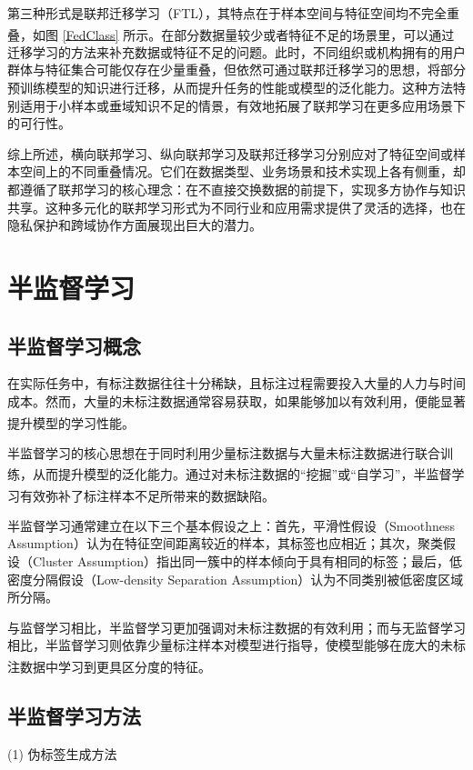 第三种形式是联邦迁移学习（FTL），其特点在于样本空间与特征空间均不完全重叠\textsuperscript{\cite{yang2019federated,chen2020vafl}}，如图 \ref{FedClass} 所示。在部分数据量较少或者特征不足的场景里，可以通过迁移学习的方法来补充数据或特征不足的问题。此时，不同组织或机构拥有的用户群体与特征集合可能仅存在少量重叠，但依然可通过联邦迁移学习的思想，将部分预训练模型的知识进行迁移，从而提升任务的性能或模型的泛化能力。这种方法特别适用于小样本或垂域知识不足的情景，有效地拓展了联邦学习在更多应用场景下的可行性。

综上所述，横向联邦学习、纵向联邦学习及联邦迁移学习分别应对了特征空间或样本空间上的不同重叠情况。它们在数据类型、业务场景和技术实现上各有侧重，却都遵循了联邦学习的核心理念：在不直接交换数据的前提下，实现多方协作与知识共享。这种多元化的联邦学习形式为不同行业和应用需求提供了灵活的选择，也在隐私保护和跨域协作方面展现出巨大的潜力。
\section{半监督学习}
\subsection{半监督学习概念}
在实际任务中，有标注数据往往十分稀缺，且标注过程需要投入大量的人力与时间成本。然而，大量的未标注数据通常容易获取，如果能够加以有效利用，便能显著提升模型的学习性能\textsuperscript{\cite{2015Semi}}。

半监督学习的核心思想在于同时利用少量标注数据与大量未标注数据进行联合训练，从而提升模型的泛化能力\textsuperscript{\cite{van2020survey}}。通过对未标注数据的“挖掘”或“自学习”，半监督学习有效弥补了标注样本不足所带来的数据缺陷\textsuperscript{\cite{van2020survey}}。

半监督学习通常建立在以下三个基本假设之上：首先，平滑性假设（Smoothness Assumption）认为在特征空间距离较近的样本，其标签也应相近；其次，聚类假设（Cluster Assumption）指出同一簇中的样本倾向于具有相同的标签；最后，低密度分隔假设（Low-density Separation Assumption）认为不同类别被低密度区域所分隔。

与监督学习相比，半监督学习更加强调对未标注数据的有效利用；而与无监督学习相比，半监督学习则依靠少量标注样本对模型进行指导，使模型能够在庞大的未标注数据中学习到更具区分度的特征\textsuperscript{\cite{van2020survey}}。
\subsection{半监督学习方法}

(1) 伪标签生成方法

